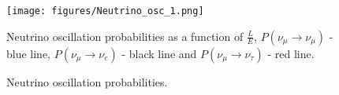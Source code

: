 \begin{figure}
\texttt{[image: figures/Neutrino\_osc\_1.png]}
\centering
\caption{Neutrino oscillation probabilities.} 
{Neutrino oscillation probabilities as a function of $\frac{L}{E}$, $P(\nu_\mu \rightarrow \nu_\mu)$ -
blue line, $P(\nu_\mu \rightarrow \nu_e)$ - black line and $P(\nu_\mu \rightarrow \nu_\tau)$ - red line.}
\label{fig:osc_prob}
\end{figure}


